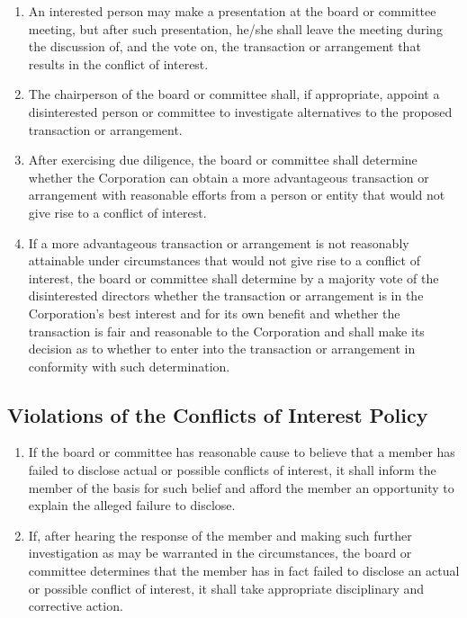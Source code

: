 \documentclass[12pt]{article}
\begin{document}
\begin{enumerate}
\item An interested person may make a presentation at the board 
or committee meeting, but after such presentation, he/she shall 
leave the meeting during the discussion of, and the vote on, the 
transaction or arrangement that results in the conflict of 
interest. 

\item The chairperson of the board or committee shall, if 
appropriate, appoint a disinterested person or committee to 
investigate alternatives to the proposed transaction or 
arrangement. 

\item After exercising due diligence, the board or committee 
shall determine whether the Corporation can obtain a more 
advantageous transaction or arrangement with reasonable efforts 
from a person or entity that would not give rise to a conflict of 
interest. 

\item If a more advantageous transaction or arrangement is not 
reasonably attainable under circumstances that would not give 
rise to a conflict of interest, the board or committee shall 
determine by a majority vote of the disinterested directors 
whether the transaction or arrangement is in the Corporation's 
best interest and for its own benefit and whether the transaction 
is fair and reasonable to the Corporation and shall make its 
decision as to whether to enter into the transaction or 
arrangement in conformity with such determination. 
\end{enumerate}

\subsection{Violations of the Conflicts of Interest Policy}

\begin{enumerate}
\item If the board or committee has reasonable cause to believe 
that a member has failed to disclose actual or possible conflicts 
of interest, it shall inform the member of the basis for such 
belief and afford the member an opportunity to explain the 
alleged failure to disclose. 

\item If, after hearing the response of the member and making 
such further investigation as may be warranted in the 
circumstances, the board or committee determines that the member 
has in fact failed to disclose an actual or possible conflict of 
interest, it shall take appropriate disciplinary and corrective 
action. 
\end{enumerate}
\end{document}
